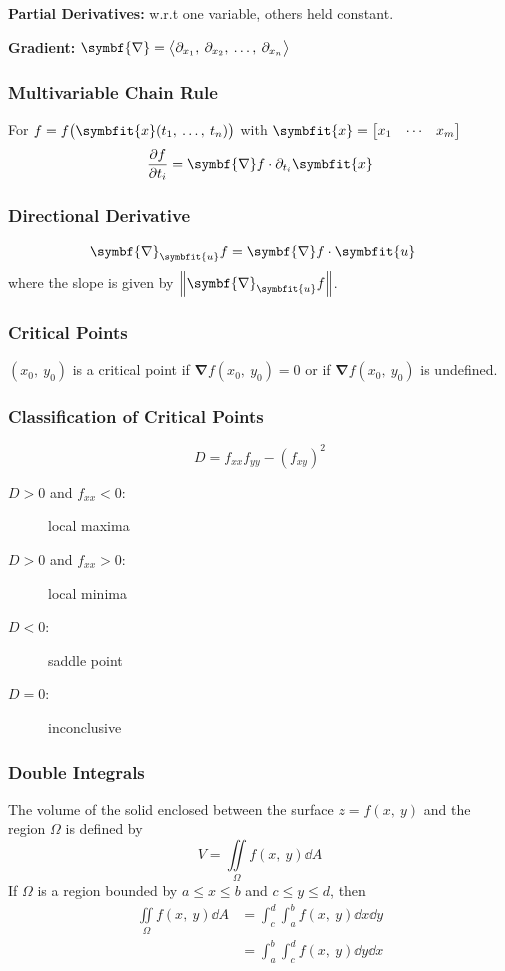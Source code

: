 \documentclass{article}
\begin{document}
\begin{multicols}{3}
    \textbf{Partial Derivatives:} w.r.t one variable, others held constant.

    \textbf{Gradient:} $\symbf{\nabla} = \avec[\big]{\partial_{x_1},\: \partial_{x_2},\: \dots,\: \partial_{x_n}}$
    \subsubsection*{Multivariable Chain Rule}
    For $f=f\bigl(\symbfit{x}(t_1,\: \ldots,\: t_n)\bigr)$ with
    $\symbfit{x}=\mqty[x_1 & \cdots & x_m]$
    \begin{equation*}
        \pdv{f}{t_i} = \symbf{\nabla}f \cdot \partial_{t_i}\symbfit{x}
    \end{equation*}
    \subsubsection*{Directional Derivative}
    \begin{align*}
        \symbf{\nabla}_{\symbfit{u}}f
         & = \symbf{\nabla}f \cdot \symbfit{u}
    \end{align*}
    where the slope is given by $\norm{\symbf{\nabla}_{\symbfit{u}}f}$.
    \subsubsection*{Critical Points}
    $(x_0,\: y_0)$ is a critical point if $\symbf{\nabla}f(x_0,\: y_0) = 0$
    or if $\symbf{\nabla}f(x_0,\: y_0)$ is undefined.
    \subsubsection*{Classification of Critical Points}
    \begin{equation*}
        D = f_{xx}f_{yy} - \left( f_{xy} \right)^2
    \end{equation*}
    \begin{description}
        \item[$D > 0$ and $f_{xx} < 0$:] local maxima
        \item[$D > 0$ and $f_{xx} > 0$:] local minima
        \item[$D < 0$:] saddle point
        \item[$D = 0$:] inconclusive
    \end{description}
    \subsubsection*{Double Integrals}
    The volume of the solid
    enclosed between the surface $z=f(x,\: y)$ and the region $\Omega$ is
    defined by
    \begin{equation*}
        V = \iint\limits_{\Omega} f(x,\: y) \dd{A}
    \end{equation*}
    If $\Omega$ is a region bounded by $a \leq x \leq b$ and $c \leq y \leq d$, then
    \begin{align*}
        \iint\limits_{\Omega} f(x,\: y) \dd{A} & = \int_c^d\int_a^b f(x,\: y) \dd{x} \dd{y} \\
                                               & = \int_a^b\int_c^d f(x,\: y) \dd{y} \dd{x}
    \end{align*}

\end{multicols}
\end{document}
